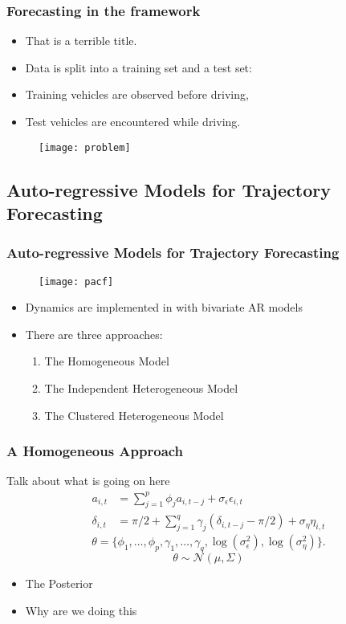 \documentclass[11pt]{beamer}\usepackage[]{graphicx}\usepackage[]{color}
\begin{document}
\begin{frame}
\frametitle{Forecasting in the framework}
\begin{itemize}
\item That is a terrible title.
\item Data is split into a training set and a test set:
\item Training vehicles are observed before driving,
\item Test vehicles are encountered while driving.
\end{itemize}
\begin{figure}
\centering
\texttt{[image: problem]}
\end{figure}
\end{frame}

\begin{frame}
\subsection{Auto-regressive Models for Trajectory Forecasting}
\frametitle{Auto-regressive Models for Trajectory Forecasting}
\begin{figure}
\centering
\texttt{[image: pacf]}
\end{figure}
\begin{itemize}
\item Dynamics are implemented in with bivariate AR models
\item There are three approaches:
\begin{enumerate}
\item The Homogeneous Model
\item The Independent Heterogeneous Model
\item The Clustered Heterogeneous Model
\end{enumerate}
\end{itemize}
\end{frame}

\begin{frame}
\frametitle{A Homogeneous Approach}
Talk about what is going on here
\begin{align}
a_{i, t} &= \sum_{j = 1}^p \phi_{j} a_{i, t-j} + \sigma_{\epsilon} \epsilon_{i, t} \label{aAR} \\
\delta_{i, t} &= \pi/2 + \sum_{j = 1}^q \gamma_{j} (\delta_{i, t-j} - \pi/2) + \sigma_{\eta} \eta_{i, t} \label{dAR}
\end{align}
\begin{equation*}
\label{thetaVec}
\theta = \{\phi_{1}, \dots, \phi_{p}, \gamma_{1}, \dots, \gamma_{q}, \log(\sigma^{2}_{\epsilon}), \log(\sigma^{2}_{\eta})\}.
\end{equation*}
\begin{equation}
\label{indPrior}
\theta \sim \mathcal{N}\left(\mu, \Sigma \right)
\end{equation}
\begin{itemize}
\item The Posterior
\item Why are we doing this
\end{itemize}
\end{frame}
\end{document}
